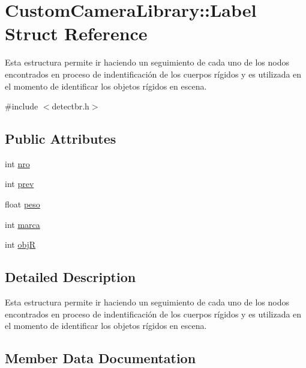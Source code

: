 \hypertarget{struct_custom_camera_library_1_1_label}{}\section{Custom\+Camera\+Library\+:\+:Label Struct Reference}
\label{struct_custom_camera_library_1_1_label}


Esta estructura permite ir haciendo un seguimiento de cada uno de los nodos encontrados en proceso de indentificación de los cuerpos rígidos y es utilizada en el momento de identificar los objetos rígidos en escena.  




{\ttfamily \#include $<$detectbr.\+h$>$}

\subsection*{Public Attributes}
\begin{DoxyCompactItemize}
\item 
int \hyperlink{struct_custom_camera_library_1_1_label_ab47ae69658cf38cb404be369acd6b004}{nro}
\item 
int \hyperlink{struct_custom_camera_library_1_1_label_ab2b02b75eea4dbbce1a157e27142019f}{prev}
\item 
float \hyperlink{struct_custom_camera_library_1_1_label_a2c76fc89c6d5ebd560e1081d456052fc}{peso}
\item 
int \hyperlink{struct_custom_camera_library_1_1_label_aee7618e63b0af9f8471c6c666ccb033f}{marca}
\item 
int \hyperlink{struct_custom_camera_library_1_1_label_a6975017853bad717d96e213e22cc0e18}{objR}
\end{DoxyCompactItemize}


\subsection{Detailed Description}
Esta estructura permite ir haciendo un seguimiento de cada uno de los nodos encontrados en proceso de indentificación de los cuerpos rígidos y es utilizada en el momento de identificar los objetos rígidos en escena. 

\subsection{Member Data Documentation}
